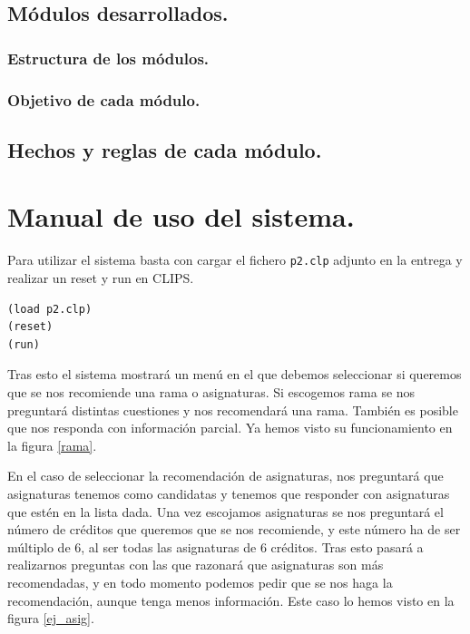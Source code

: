 \documentclass[12pt, spanish]{article}
\begin{document}
\subsection{Módulos desarrollados.}

\subsubsection{Estructura de los módulos.}

\subsubsection{Objetivo de cada módulo.}


\subsection{Hechos y reglas de cada módulo.}


\newpage

\section{Manual de uso del sistema.}

Para utilizar el sistema basta con cargar el fichero \texttt{p2.clp} adjunto en la entrega y realizar un reset y run en CLIPS.

\begin{lstlisting}
(load p2.clp)
(reset)
(run)
\end{lstlisting}

Tras esto el sistema mostrará un menú en el que debemos seleccionar si queremos que se nos recomiende una rama o asignaturas. Si escogemos rama se nos preguntará distintas cuestiones y nos recomendará una rama. También es posible que nos responda con información parcial. Ya hemos visto su funcionamiento en la figura \ref{rama}.


En el caso de seleccionar la recomendación de asignaturas, nos preguntará que asignaturas tenemos como candidatas y tenemos que responder con asignaturas que estén en la lista dada. Una vez escojamos asignaturas se nos preguntará el número de créditos que queremos que se nos recomiende, y este número ha de ser múltiplo de 6, al ser todas las asignaturas de 6 créditos. Tras esto pasará a realizarnos preguntas con las que razonará que asignaturas son más recomendadas, y en todo momento podemos pedir que se nos haga la recomendación, aunque tenga menos información. Este caso lo hemos visto en la figura \ref{ej_asig}.
\end{document}
